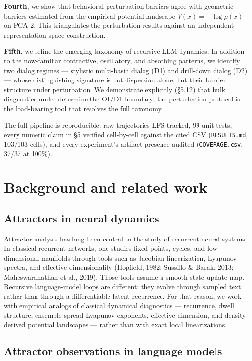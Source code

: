 \documentclass{article}
\theoremstyle{plain}
\theoremstyle{definition}
\begin{document}
\textbf{Fourth}, we show that behavioral perturbation barriers agree with
geometric barriers estimated from the empirical potential landscape
$V(x) = -\log \rho(x)$ on PCA-2. This triangulates the perturbation
results against an independent representation-space construction.

\textbf{Fifth}, we refine the emerging taxonomy of recursive LLM dynamics.
In addition to the now-familiar contractive, oscillatory, and
absorbing patterns, we identify two dialog regimes — stylistic
multi-basin dialog (D1) and drill-down dialog (D2) — whose
distinguishing signature is not dispersion alone, but their barrier
structure under perturbation. We demonstrate explicitly (§5.12) that
bulk diagnostics under-determine the O1/D1 boundary; the perturbation
protocol is the load-bearing tool that resolves the full taxonomy.

The full pipeline is reproducible: raw trajectories LFS-tracked, 99
unit tests, every numeric claim in §5 verified cell-by-cell against
the cited CSV (\texttt{RESULTS.md}, 103/103 cells), and every experiment's
artifact presence audited (\texttt{COVERAGE.csv}, 37/37 at 100\%).


\section{Background and related work}

\subsection{Attractors in neural dynamics}

Attractor analysis has long been central to the study of recurrent
neural systems. In classical recurrent networks, one studies fixed
points, cycles, and low-dimensional manifolds through tools such as
Jacobian linearization, Lyapunov spectra, and effective dimensionality
(Hopfield, 1982; Sussillo \& Barak, 2013; Maheswaranathan et al., 2019).
Those tools assume a smooth state-update map. Recursive language-model
loops are different: they evolve through sampled text rather than
through a differentiable latent recurrence. For that reason, we work
with empirical analogs of classical dynamical diagnostics —
recurrence, dwell structure, ensemble-spread Lyapunov exponents,
effective dimension, and density-derived potential landscapes — rather
than with exact local linearizations.

\subsection{Attractor observations in language models}
\end{document}
